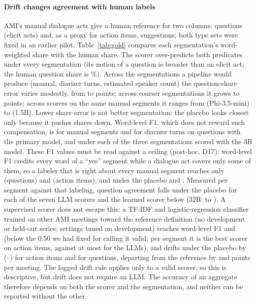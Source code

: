 \documentclass[conference]{IEEEtran}
\begin{document}
\paragraph*{Drift changes agreement with human labels} AMI's manual dialogue acts give a human reference for two
columns: questions (elicit acts) and, as a proxy for action items, suggestions; both type sets were fixed in an earlier
pilot. Table~\ref{tab:gold} compares each segmentation's word-weighted share with the human share. The scorer
over-predicts both predicates under every segmentation (its notion of a question is broader than an elicit act; the
human question share is \nGoldQushare\%). Across the segmentations a pipeline would produce (manual, diarizer turns,
estimated speaker count) the question-share error varies modestly, from \nGoldQumanualabserr{} to
\nGoldQuwoneoldabserr{} points; across coarser segmentations it grows to \nGoldQumergeeightabserr{} points; across
scorers on the same manual segments it ranges from \nGoldQumanualabserrMphi{} (Phi-3.5-mini) to
\nGoldQumanualabserr{} (1.5B).
Lower share error is not better segmentation: the placebo looks closest only because it pushes shares down. Word-level
F1, which does not reward such compensation, is \nGoldQumanualfone{} for manual segments and \nGoldQuwoneoldfone{} for
diarizer turns on questions with the primary model, and \nGoldQumanualfoneMthree{} under each of the three
segmentations scored with the 3B model. These F1 values must be read against a ceiling (post-hoc, D17): word-level F1
credits every word of a ``yes'' segment while a dialogue act covers only some of them, so a labeler that is right
about every manual segment reaches only \nCeilQu{} (questions) and \nCeilAc{} (action items), and under the placebo
\nCeilQuPl{} and \nCeilAcPl. Measured per segment against that labeling, question agreement falls under the placebo
for each of the seven LLM scorers and the learned scorer below (32B: \nSegThirtytwoQu{} to \nSegThirtytwoPlQu). A supervised scorer does not escape
this: a TF-IDF and logistic-regression classifier trained on \nLrnTrainN{} other AMI meetings toward the reference
definition (no development or held-out series; settings tuned on development) reaches word-level F1 \nLrnFoneQu{} and
\nLrnFoneAc{} (below the 0.50 we had fixed for calling it valid; per segment it is the best scorer on action items,
\nSegLrnAc{} against at most \nSegLlmMaxAc{} for the LLMs), and drifts under the placebo by \nLrnWtwoAcD{}
(\nLrnWtwoAcDlo--\nLrnWtwoAcDhi) for action items and \nLrnWtwoQuD{} for questions, departing from the reference by
\nLrnWtwoAcEx{} and \nLrnWtwoQuEx{} points per meeting. The logged drift rule applies only to a valid scorer, so this is descriptive, but drift does
not require an LLM. The accuracy
of an aggregate therefore depends on both the scorer and the segmentation, and neither can be reported without the
other.
\end{document}
